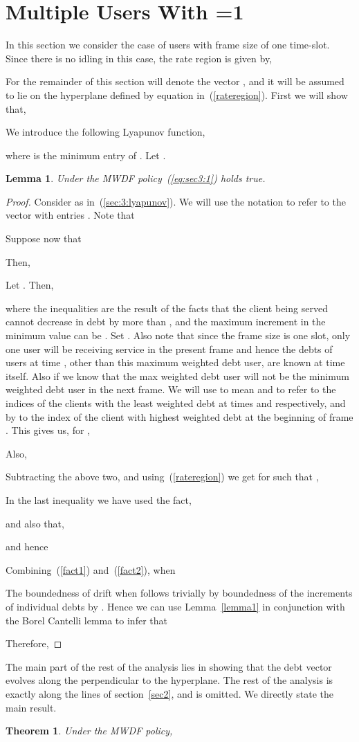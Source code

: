 \documentclass[letterpaper, 10 pt, conference]{ieeeconf}
\newtheorem{lemma}{Lemma}
\newtheorem{theorem}{Theorem}
\begin{document}
\section{Multiple Users With =1}\label{sec5}
In this section we consider the case of  users with frame size of one time-slot.
Since there is no idling in this case, the rate region is given by,

For the remainder of this section  will denote the vector , and it will be assumed to lie on the hyperplane defined by equation in~(\ref{rateregion}). First we will show that, 

We introduce the following Lyapunov function,

where  is the minimum entry of . Let .
\begin{lemma}\label{sec:3:lemma1}
 Under the MWDF policy~(\ref{eq:sec3:1}) holds true.
\end{lemma} 
\begin{proof}
 Consider  as in~(\ref{sec:3:lyapunov}). We will use the notation  to refer to the vector with entries . Note that

Suppose now that 

Then,

Let . Then,

where the inequalities are the result of the facts that the client being served cannot decrease in debt by more than , and the maximum increment in the minimum value can be .
Set . Also note that since the frame size is one slot, only one user  will be receiving service in the present frame and hence the debts of users at time , other than this maximum weighted debt user, are known at time  itself. Also if  we know that the max weighted debt user will not be the minimum weighted debt user in the next frame. We will use  to mean  and  to refer to the indices of the clients with the least weighted debt at times  and  respectively, and by  to the index of the client with highest weighted debt at the beginning of frame . This gives us, for ,

Also,

Subtracting the above two, and using~(\ref{rateregion}) we get for  such that  ,

In the last inequality we have used the fact,

and also that,

and hence
 
Combining~(\ref{fact1}) and~(\ref{fact2}), when   

The boundedness of drift when  follows trivially by boundedness of the increments of individual debts by . Hence we can use Lemma~\ref{lemma1} in conjunction with the Borel Cantelli lemma to infer that

Therefore,

\end{proof}
The main part of the rest of the analysis lies in showing that the debt vector evolves along the perpendicular to the hyperplane. The rest of the analysis is exactly along the lines of section~\ref{sec2}, and is omitted. We directly state the main result.
\begin{theorem}\label{theorem:main2}
Under the MWDF policy, 

\end{theorem}
\end{document}
